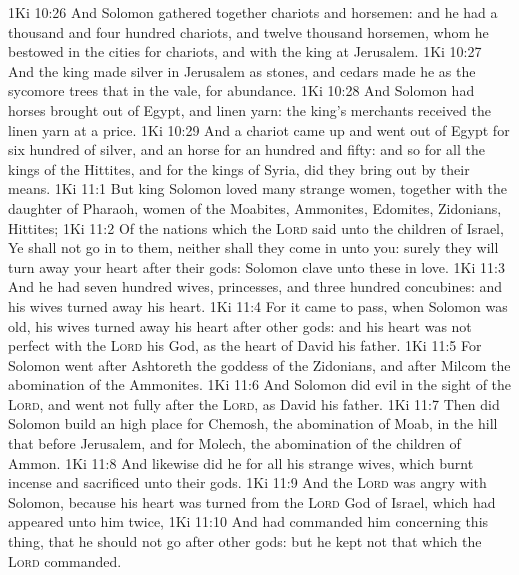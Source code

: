 \vs 1Ki 10:26 And Solomon gathered together chariots and horsemen: and he had a thousand and four hundred chariots, and twelve thousand horsemen, whom he bestowed in the cities for chariots, and with the king at Jerusalem.
\vs 1Ki 10:27 And the king made silver  in Jerusalem as stones, and cedars made he  as the sycomore trees that  in the vale, for abundance.
\vs 1Ki 10:28 And Solomon had horses brought out of Egypt, and linen yarn: the king's merchants received the linen yarn at a price.
\vs 1Ki 10:29 And a chariot came up and went out of Egypt for six hundred  of silver, and an horse for an hundred and fifty: and so for all the kings of the Hittites, and for the kings of Syria, did they bring  out by their means.
\vs 1Ki 11:1 But king Solomon loved many strange women, together with the daughter of Pharaoh, women of the Moabites, Ammonites, Edomites, Zidonians,  Hittites;
\vs 1Ki 11:2 Of the nations  which the \textsc{Lord} said unto the children of Israel, Ye shall not go in to them, neither shall they come in unto you:  surely they will turn away your heart after their gods: Solomon clave unto these in love.
\vs 1Ki 11:3 And he had seven hundred wives, princesses, and three hundred concubines: and his wives turned away his heart.
\vs 1Ki 11:4 For it came to pass, when Solomon was old,  his wives turned away his heart after other gods: and his heart was not perfect with the \textsc{Lord} his God, as  the heart of David his father.
\vs 1Ki 11:5 For Solomon went after Ashtoreth the goddess of the Zidonians, and after Milcom the abomination of the Ammonites.
\vs 1Ki 11:6 And Solomon did evil in the sight of the \textsc{Lord}, and went not fully after the \textsc{Lord}, as  David his father.
\vs 1Ki 11:7 Then did Solomon build an high place for Chemosh, the abomination of Moab, in the hill that  before Jerusalem, and for Molech, the abomination of the children of Ammon.
\vs 1Ki 11:8 And likewise did he for all his strange wives, which burnt incense and sacrificed unto their gods.
\vs 1Ki 11:9 And the \textsc{Lord} was angry with Solomon, because his heart was turned from the \textsc{Lord} God of Israel, which had appeared unto him twice,
\vs 1Ki 11:10 And had commanded him concerning this thing, that he should not go after other gods: but he kept not that which the \textsc{Lord} commanded.
